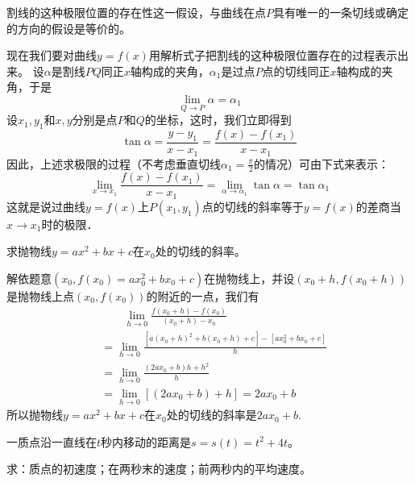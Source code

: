 割线的这种极限位置的存在性这一假设，与曲线在点$P$具有唯一的一条切线或确定的方向的假设是等价的。

现在我们要对曲线$y=f(x)$用解析式子把割线的这种极限位置存在的过程表示出来。
设$\alpha$是割线$PQ$同正$x$轴构成的夹角，$\alpha_1$是过点$P$点的切线同正$x$轴构成的夹角，于是
\[\lim_{Q\to P}\alpha=\alpha_1\]
设$x_1,y_1$和$x,y$分别是点$P$和$Q$的坐标，这时，我们立即得到
\[\tan\alpha=\frac{y-y_1}{x-x_1}=\frac{f(x)-f(x_1)}{x-x_1}\]
因此，上述求极限的过程（不考虑垂直切线$\alpha_1=\frac{\pi}{2}$的情况）可由下式来表示：
\[\lim_{x\to x_1}\frac{f(x)-f(x_1)}{x-x_1}=\lim_{\alpha\to \alpha_1}\tan\alpha=\tan\alpha_1\]
这就是说过曲线$y=f(x)$上$P(x_1,y_1)$点的切线的斜率等于$y=f(x)$的差商当$x\to x_1$时的极限．

\begin{example}
    求抛物线$y=ax^2+bx+c$在$x_0$处的切线的斜率。
\end{example}

\begin{solution}
    解依题意$(x_0,f(x_0)=ax_0^2+bx_0+c)$在抛物线上，并设$(x_0+h,f(x_0+h))$是抛物线上点$(x_0,f(x_0))$的附近的一点，我们有
\[\begin{split}
&\qquad \lim_{h\to 0}\frac{f(x_0+h)-f(x_0)}{(x_0+h)-x_0}\\
&=\lim_{h\to 0}\frac{[a(x_0+h)^2+b(x_0+h)+c]-[ax^2_0+bx_0+c]}{h}    \\
&=\lim_{h\to 0}\frac{(2ax_0+b)h+h^2}{h}\\
&=\lim_{h\to 0}[(2ax_0+b)+h]=2ax_0+b
\end{split}\]
所以抛物线$y=ax^2+bx+c$在$x_0$处的切线的斜率是$2ax_0+b$.
\end{solution}

\begin{example}
    一质点沿一直线在$t$秒内移动的距离是$s=s(t)=t^2+4t$。
    
    求：质点的初速度；在两秒末的速度；前两秒内的平均速度。
\end{example}

